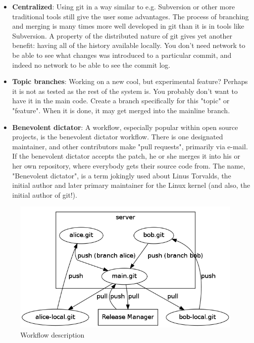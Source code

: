 \documentclass{llncs}
\begin{document}
\begin{itemize}
 \item \textbf{Centralized}: 
  Using git in a way similar to e.g. Subversion or other more traditional
  tools still give the user some advantages. The process of branching and
  merging is many times more well developed in git than it is in tools like
  Subversion. A property of the distributed nature of git gives yet another
  benefit: having all of the history available locally. You don't need
  network to be able to see what changes was introduced to a particular
  commit, and indeed no network to be able to see the commit log.

 \item \textbf{Topic branches}: 
  Working on a new cool, but experimental feature? Perhaps it is not as 
  tested as the rest of the system is. You probably don't want to have 
  it in the main code. Create a branch specifically for this "topic" or
  "feature". When it is done, it may get merged into the mainline
	branch.

 \item \textbf{Benevolent dictator}: 
  A workflow, especially popular within open source projects, is the
  benevolent dictator workflow. There is one designated maintainer, and
  other contributors make "pull requests", primarily via e-mail.  If the
  benevolent dictator accepts the patch, he or she merges it into his or
  her own repository, where everybody gets their source code from. The
  name, "Benevolent dictator", is a term jokingly used about Linus
  Torvalds, the initial author and later primary maintainer for the Linux
  kernel (and also, the initial author of git!).
\end{itemize}

\begin{figure}[tp]
 \begin{center}
  \includegraphics[scale=0.5]{workflow.png}
  \caption{Workflow description}
  \label{fig:workflow}
 \end{center}
\end{figure}
\end{document}
